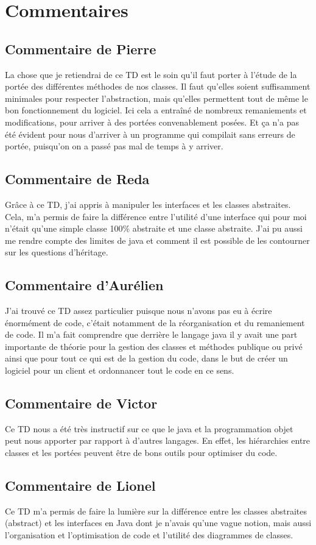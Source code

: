 \documentclass[a4paper,11pt]{article}
\begin{document}
\section{Commentaires}
\subsection{Commentaire de Pierre}
La chose que je retiendrai de ce TD est le soin qu'il faut porter à l'étude de la portée des différentes méthodes de nos classes. Il faut qu'elles soient suffisamment minimales pour respecter l'abstraction, mais qu'elles permettent tout de même le bon fonctionnement du logiciel. Ici cela a entraîné de nombreux remaniements et modifications, pour arriver à des portées convenablement posées. Et ça n'a pas été évident pour nous d'arriver à un programme qui compilait sans erreurs de portée, puisqu'on on a passé pas mal de temps à y arriver.

\subsection{Commentaire de Reda}
Grâce à ce TD, j'ai appris à manipuler les interfaces et les classes abstraites. Cela, m'a permis de faire la différence entre l'utilité d'une interface qui pour moi n'était qu'une simple classe 100\% abstraite et une classe abstraite. J'ai pu aussi me rendre compte des limites de java et comment il est possible de les contourner sur les questions d'héritage.

\subsection{Commentaire d'Aurélien}
J'ai trouvé ce TD assez particulier puisque nous n'avons pas eu à écrire énormément de code, c'était notamment de la réorganisation et du remaniement de code. 
Il m'a fait comprendre que derrière le langage java il y avait une part importante de théorie pour la gestion des classes et méthodes publique ou privé ainsi que 
pour tout ce qui est de la gestion du code, dans le but de créer un logiciel pour un client et ordonnancer tout le code en ce sens.

\subsection{Commentaire de Victor}
Ce TD nous a été très instructif sur ce que le java et la programmation objet peut nous apporter par rapport à d'autres langages. En effet, les hiérarchies entre classes et les portées peuvent être de bons outils pour optimiser du code.

\subsection{Commentaire de Lionel}
Ce TD m'a permis de faire la lumière sur la différence entre les classes abstraites (abstract) et les interfaces en Java dont je n'avais qu'une vague notion, mais aussi l'organisation et l'optimisation de code et l'utilité des diagrammes de classes.
\end{document}
